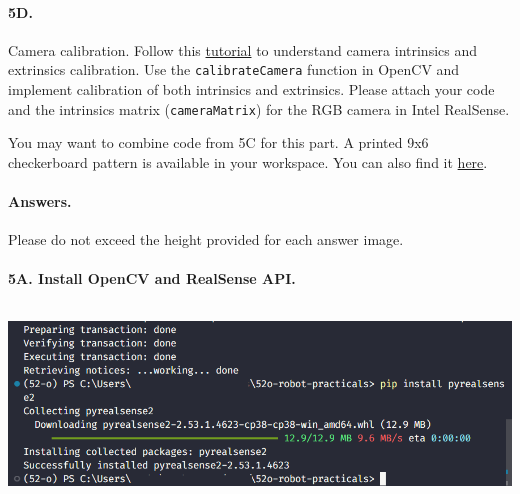 \paragraph{5D.} Camera calibration.
Follow this \href{https://docs.opencv.org/3.4/dc/dbb/tutorial_py_calibration.html}{tutorial} to understand camera intrinsics and extrinsics calibration.
Use the \texttt{calibrateCamera} function in OpenCV and implement calibration of both intrinsics and extrinsics.
Please attach your code and the intrinsics matrix (\texttt{cameraMatrix}) for the RGB camera in Intel RealSense.

You may want to combine code from 5C for this part.
A printed 9x6 checkerboard pattern is available in your workspace.
You can also find it \href{https://drive.google.com/file/d/1Hk-U4xiAmZnrf3qGziQWBW7YbEMFTWgY/view?usp=sharing}{here}.
 
\newpage
\paragraph{Answers.}
Please do not exceed the height provided for each answer image.


\paragraph{5A. Install OpenCV and RealSense API.}
\begin{center}
    \includegraphics[height=2in]{image/5a_vision.png}
\end{center}

